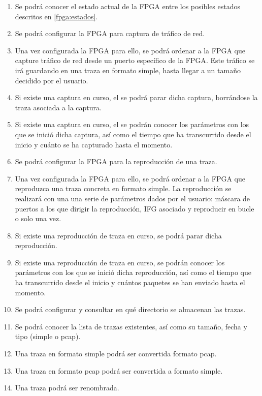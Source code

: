 \begin{enumerate}[before=\itshape,font=\normalfont,label=\bfseries RF. \arabic*]
  \item Se podrá conocer el estado actual de la \gls{FPGA} entre los posibles estados descritos en \ref{fpga:estados}.
  \item Se podrá configurar la \gls{FPGA} para captura de tráfico de red.
  \item Una vez configurada la \gls{FPGA} para ello, se podrá ordenar a la \gls{FPGA} que capture tráfico de red desde un puerto específico de la \gls{FPGA}. Este tráfico se irá guardando en una \gls{traza} en formato \gls{simple}, hasta llegar a un tamaño decidido por el usuario.
  \item Si existe una captura en curso, el se podrá parar dicha captura, borrándose la \gls{traza} asociada a la captura.
  \item Si existe una captura en curso, el se podrán conocer los parámetros con los que se inició dicha captura, así como el tiempo que ha transcurrido desde el inicio y cuánto se ha capturado hasta el momento.
  \item Se podrá configurar la \gls{FPGA} para la reproducción de una \gls{traza}.
  \item Una vez configurada la \gls{FPGA} para ello, se podrá ordenar a la \gls{FPGA} que reproduzca una \gls{traza} concreta en formato \gls{simple}. La reproducción se realizará con una una serie de parámetros dados por el usuario: máscara de puertos a los que dirigir la reproducción, \gls{IFG} asociado y reproducir en bucle o solo una vez.
  \item Si existe una reproducción de \gls{traza} en curso, se podrá parar dicha reproducción.
  \item Si existe una reproducción de \gls{traza} en curso, se podrán conocer los parámetros con los que se inició dicha reproducción, así como el tiempo que ha transcurrido desde el inicio y cuántos paquetes se han enviado hasta el momento.
  \item Se podrá configurar y consultar en qué directorio se almacenan las \glspl{traza}.
  \item Se podrá conocer la lista de \glspl{traza} existentes, así como su tamaño, fecha y tipo (\gls{simple} o \gls{pcap}).
  \item Una traza en formato \gls{simple} podrá ser convertida formato \gls{pcap}.
  \item Una traza en formato \gls{pcap} podrá ser convertida a formato \gls{simple}.
  \item Una \gls{traza} podrá ser renombrada.

\end{enumerate}
